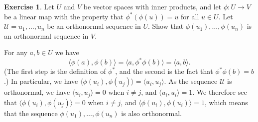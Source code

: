 \documentclass{amsart}
\newcommand{\ip}[1]     {\langle #1\rangle}
\newcommand{\CU}        {{\mathcal{U}}}
\renewcommand{\:}       {\colon}
\theoremstyle{definition}
\newtheorem{exercise}{Exercise}[section]
\renewenvironment{solution}{\SolutionAtEnd}{\endSolutionAtEnd}
\begin{document}
\begin{exercise}
 Let $U$ and $V$ be vector spaces with inner products, and
 let $\phi\:U\to V$ be a linear map with the property that
 $\phi^*(\phi(u))=u$ for all $u\in U$.  Let
 $\CU=u_1,\dotsc,u_n$ be an orthonormal sequence in $U$.
 Show that $\phi(u_1),\dotsc,\phi(u_n)$ is an orthonormal
 sequence in $V$.
\end{exercise}
\begin{solution}
 For any $a,b\in U$ we have 
 \[ \ip{\phi(a),\phi(b)}=\ip{a,\phi^*\phi(b)}=\ip{a,b}. \]
 (The first step is the definition of $\phi^*$, and the
 second is the fact that $\phi^*\phi(b)=b$.)  In particular,
 we have $\ip{\phi(u_i),\phi(u_j)}=\ip{u_i,u_j}$.  As the
 sequence $\CU$ is orthonormal, we have $\ip{u_i,u_j}=0$
 when $i\neq j$, and $\ip{u_i,u_i}=1$.  We therefore see
 that $\ip{\phi(u_i),\phi(u_j)}=0$ when $i\neq j$, and
 $\ip{\phi(u_i),\phi(u_i)}=1$, which means that the sequence
 $\phi(u_1),\dotsc,\phi(u_n)$ is also orthonormal.
\end{solution}
\end{document}
